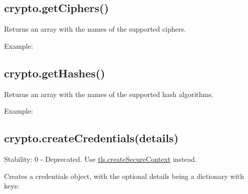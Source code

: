 \subsection{crypto.getCiphers()}\label{crypto.getciphers}

Returns an array with the names of the supported ciphers.

Example:

\begin{Shaded}
\begin{Highlighting}[]
 \NormalTok{();}
\end{Highlighting}
\end{Shaded}

\subsection{crypto.getHashes()}\label{crypto.gethashes}

Returns an array with the names of the supported hash algorithms.

Example:

\begin{Shaded}
\begin{Highlighting}[]
 \NormalTok{();}
\end{Highlighting}
\end{Shaded}

\subsection{crypto.createCredentials(details)}\label{crypto.createcredentialsdetails}

Stability: 0 - Deprecated. Use
\href{tls.html\#tls_tls_createsecurecontext_details}{tls.createSecureContext}
instead.

Creates a credentials object, with the optional details being a
dictionary with keys:

